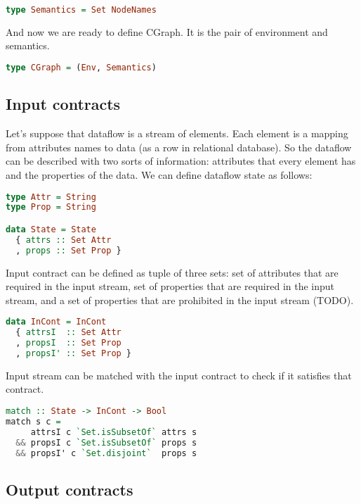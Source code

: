 \begin{lstlisting}[language=Haskell]
type Semantics = Set NodeNames
\end{lstlisting}

And now we are ready to define CGraph.
It is the pair of environment and semantics.

\begin{lstlisting}[language=Haskell]
type CGraph = (Env, Semantics)
\end{lstlisting}


\subsection{Input contracts}

Let's suppose that dataflow is a stream of elements.
Each element is a mapping from attributes names to data (as a row in relational database).
So the dataflow can be described with two sorts of information: attributes that every element has and the properties of the data.
We can define dataflow state as follows:

\begin{lstlisting}[language=Haskell]
type Attr = String
type Prop = String

data State = State
  { attrs :: Set Attr
  , props :: Set Prop }
\end{lstlisting}

Input contract can be defined as tuple of three sets:
set of attributes that are required in the input stream,
set of properties that are required in the input stream,
and a set of properties that are prohibited in the input stream (TODO).

\begin{lstlisting}[language=Haskell]
data InCont = InCont
  { attrsI  :: Set Attr
  , propsI  :: Set Prop
  , propsI' :: Set Prop }
\end{lstlisting}

Input stream can be matched with the input contract to check if it satisfies that contract.

\begin{lstlisting}[language=Haskell]
match :: State -> InCont -> Bool
match s c =
     attrsI c `Set.isSubsetOf` attrs s
  && propsI c `Set.isSubsetOf` props s
  && propsI' c `Set.disjoint`  props s
\end{lstlisting}


\subsection{Output contracts}

